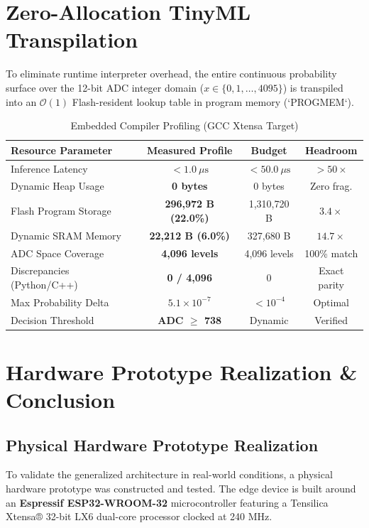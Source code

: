 \documentclass[conference]{IEEEtran}
\begin{document}
\section{Zero-Allocation TinyML Transpilation}
To eliminate runtime interpreter overhead, the entire continuous probability surface over the 12-bit ADC integer domain ($x \in \{0, 1, \dots, 4095\}$) is transpiled into an $\mathcal{O}(1)$ Flash-resident lookup table in program memory (`PROGMEM`).

\begin{table}[htbp]
\caption{Embedded Compiler Profiling (GCC Xtensa Target)}
\begin{center}
\begin{tabular}{lccc}
\toprule
\textbf{Resource Parameter} & \textbf{Measured Profile} & \textbf{Budget} & \textbf{Headroom} \\
\midrule
Inference Latency & \textbf{$< 1.0\ \mu\text{s}$} & $< 50.0\ \mu\text{s}$ & $> 50\times$ \\
Dynamic Heap Usage & \textbf{0 bytes} & 0 bytes & Zero frag. \\
Flash Program Storage & \textbf{296,972 B (22.0\%)} & 1,310,720 B & $3.4\times$ \\
Dynamic SRAM Memory & \textbf{22,212 B (6.0\%)} & 327,680 B & $14.7\times$ \\
ADC Space Coverage & \textbf{4,096 levels} & 4,096 levels & 100\% match \\
Discrepancies (Python/C++) & \textbf{0 / 4,096} & 0 & Exact parity \\
Max Probability Delta & \textbf{$5.1 \times 10^{-7}$} & $< 10^{-4}$ & Optimal \\
Decision Threshold & \textbf{ADC $\ge$ 738} & Dynamic & Verified \\
\bottomrule
\end{tabular}
\label{tab:embedded}
\end{center}
\end{table}

\section{Hardware Prototype Realization \& Conclusion}

\subsection{Physical Hardware Prototype Realization}
To validate the generalized architecture in real-world conditions, a physical hardware prototype was constructed and tested. The edge device is built around an \textbf{Espressif ESP32-WROOM-32} microcontroller featuring a Tensilica Xtensa® 32-bit LX6 dual-core processor clocked at 240 MHz. 
\end{document}
